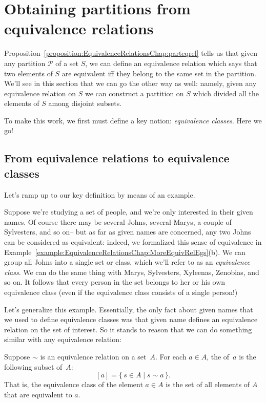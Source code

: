 \section{Obtaining partitions from equivalence relations\quad{}} \label{EquivalenceRelationsDefnSect}

Proposition~\ref{proposition:EquivalenceRelationsChap:parteqrel} tells us that given any partition $\mathcal{P}$ of a set $S$, we can define an equivalence relation which says that two elements of $S$ are equivalent iff they belong to the same set in the partition. We'll see in this section that we can go the other way as well: namely, given any equivalence relation on $S$ we can construct a partition on $S$ which divided all the elements of $S$ among disjoint subsets.

To make this work, we first must define a key notion: \emph{equivalence classes}. Here we go!

 \subsection{From equivalence relations to equivalence classes}

Let's ramp up to our key definition by means of  an example. 

\begin{example}{}
Suppose we're studying a set of people, and we're only interested in their given names.  Of course there may be several Johns, several Marys, a couple of Sylvesters, and so on-- but  as far as given names are concerned, any two Johns can be considered as equivalent: indeed, we formalized this sense of equivalence in Example~\ref{example:EquivalenceRelationsChap:MoreEquivRelEgs}(b). We can group all Johns into a single set or class, which we'll refer to as an  \emph{equivalence class}. We can do the same thing with Marys, Sylvesters, Xyleenas, Zenobias, and so on. It follows that every person in the set belongs to her or his own equivalence class (even if the equivalence class consists of a single person!)
\end{example}

Let's generalize this example. Essentially, the only fact about given names that we used to define equivalence classes was that given name defines an equivalence relation on the set of interest. So it stands to reason that we can do something similar with any equivalence relation:
 
 \begin{defn}\label{DefEquivRel}
 Suppose $\sim$ is an equivalence relation on a set~$A$. For each $a \in A$, the  of~$a$ is the following subset of~$A$:
 	$$ [a] = \{\, s \in A \mid s \sim a \,\} .$$
That is, the equivalence class of the element $a \in A$ is the set of all elements of $A$ that are equivalent to $a$.
\end{defn}


